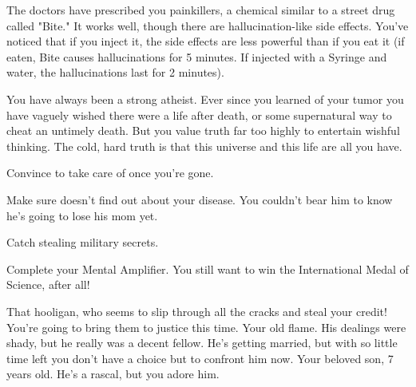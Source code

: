 \documentclass[char]{guildcamp1}
\begin{document}
The doctors have prescribed you painkillers, a chemical similar to a street drug called "Bite." It works well, though there are hallucination-like side effects. You've noticed that if you inject it, the side effects are less powerful than if you eat it (if eaten, Bite causes hallucinations for 5 minutes. If injected with a Syringe and water, the hallucinations last for 2 minutes).

You have always been a strong atheist.  Ever since you learned of your tumor you have vaguely wished there were a life after death, or some supernatural way to cheat an untimely death.  But you value truth far too highly to entertain wishful thinking.  The cold, hard truth is that this universe and this life are all you have.




\begin{itemz}[Goals]
  \item Convince \cGroomA{} to take care of \cKid{} once you're gone.
  \item Make sure \cKid{} doesn't find out about your disease. You couldn't bear him to know he's going to lose his mom yet.
  \item Catch \cRival{} stealing military secrets.
  \item Complete your Mental Amplifier. You still want to win the International Medal of Science, after all!
\end{itemz}

\begin{contacts}
  \contact{\cRival{}} That hooligan, who seems to slip through all the cracks and steal your credit! You're going to bring them to justice this time.
  \contact{\cGroomA{}} Your old flame. His dealings were shady, but he really was a decent fellow. He's getting married, but with so little time left you don't have a choice but to confront him now.
    \contact{\cKid{}} Your beloved son, 7 years old. He's a rascal, but you adore him.
\end{contacts}
\end{document}
